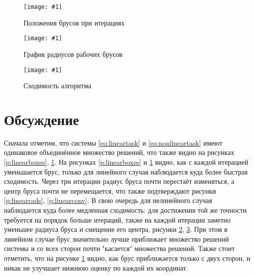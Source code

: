 \documentclass[a4paper,12pt]{article}
\newcommand{\plot}[3]{
    \begin{figure}[H]
        \texttt{[image: \#1]}
        \caption{#2}
        \label{#3}
    \end{figure}
}
\begin{document}
    \plot{NonlinearBoxes}{Положения брусов при итерациях}{p:nonlinearboxes}
    \plot{NonlinearRads}{График радиусов рабочих брусов}{p:nonlinearrads}
    \plot{NonlinearConv}{Сходимость алгоритма}{p:nonlinearconv}

    \section{Обсуждение}
    Сначала отметим, что системы \ref{eq:lineartask} и \ref{eq:nonlineartask} имеют одинаковое объединённое множество решений, что также видно на рисунках \ref{p:linearboxes}, \ref{p:nonlinearboxes}.
    На рисунках \ref{p:linearboxes} и \ref{p:nonlinearboxes} видно, как с каждой итерацией уменьшается брус, только для линейного случая наблюдается куда более быстрая сходимость.
    Через три итерации радиус бруса почти перестаёт изменяться, а центр бруса почти не перемещается, что также подтверждают рисунки \ref{p:linearrads}, \ref{p:linearconv}.
    В свою очередь для нелинейного случая наблюдается куда более медленная сходимость: для достижения той же точности требуется на порядок больше итераций,
    также на каждой итерации заметно уменьшее радиуса бруса и смещение его центра, рисунки \ref{p:nonlinearrads}, \ref{p:nonlinearconv}.
    При этом в линейном случае брус значительно лучше приближает множество решений системы и со всех сторон почти "касается" множества решений.
    Также стоит отметить, что на рисунке \ref{p:nonlinearboxes} видно, как брус приближается только с двух сторон, и никак не улучшает нижнюю оценку по каждой их координат.
\end{document}
